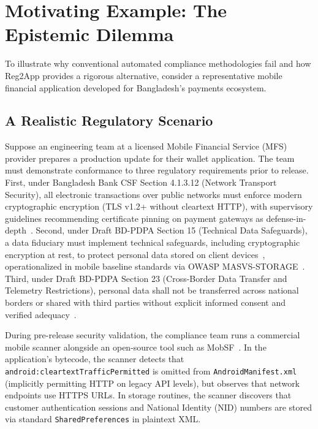 \section{Motivating Example: The Epistemic Dilemma}
\label{sec:motivating}

To illustrate why conventional automated compliance methodologies fail and how Reg2App provides a rigorous alternative, consider a representative mobile financial application developed for Bangladesh's payments ecosystem. 

\subsection{A Realistic Regulatory Scenario}
\label{sec:motivating:scenario}

Suppose an engineering team at a licensed Mobile Financial Service (MFS) provider prepares a production update for their wallet application. The team must demonstrate conformance to three regulatory requirements prior to release. First, under Bangladesh Bank CSF Section 4.1.3.12 (Network Transport Security), all electronic transactions over public networks must enforce modern cryptographic encryption (TLS v1.2+ without cleartext HTTP), with supervisory guidelines recommending certificate pinning on payment gateways as defense-in-depth~\cite{fahl_msc, castle_crypto}. Second, under Draft BD-PDPA Section 15 (Technical Data Safeguards), a data fiduciary must implement technical safeguards, including cryptographic encryption at rest, to protect personal data stored on client devices~\cite{bd_pdpa_2026}, operationalized in mobile baseline standards via OWASP MASVS-STORAGE~\cite{owasp_masvs}. Third, under Draft BD-PDPA Section 23 (Cross-Border Data Transfer and Telemetry Restrictions), personal data shall not be transferred across national borders or shared with third parties without explicit informed consent and verified adequacy~\cite{bd_pdpa_2026}.

During pre-release security validation, the compliance team runs a commercial mobile scanner alongside an open-source tool such as MobSF~\cite{mobsf}. In the application's bytecode, the scanner detects that \texttt{android:cleartextTrafficPermitted} is omitted from \texttt{AndroidManifest.xml} (implicitly permitting HTTP on legacy API levels), but observes that network endpoints use HTTPS URLs. In storage routines, the scanner discovers that customer authentication sessions and National Identity (NID) numbers are stored via standard \texttt{SharedPreferences} in plaintext XML.

